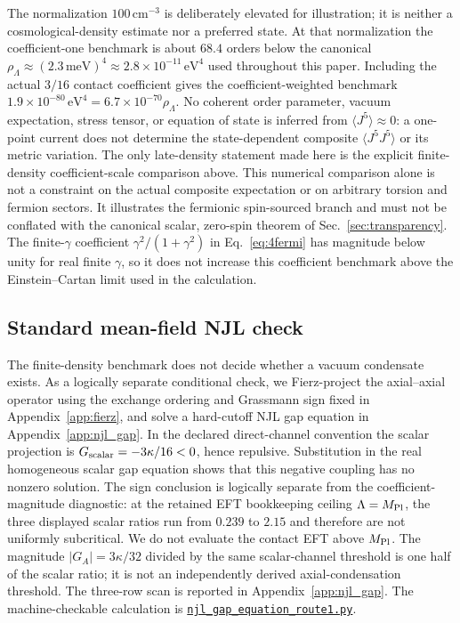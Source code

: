 \documentclass[aps,prd,twocolumn,superscriptaddress,preprintnumbers,nofootinbib,longbibliography,floatfix]{revtex4-2}
\newcommand{\artifactnamed}[2]{\href{https://github.com/Hubify-Projects/bigbounce/blob/main/#1}{\nolinkurl{#2}}}
\begin{document}
The normalization $100\,\mathrm{cm}^{-3}$ is deliberately elevated for
illustration; it is neither a cosmological-density estimate nor a preferred
state.  At that normalization the coefficient-one benchmark is about $68.4$
orders below the canonical
$\rho_\Lambda\approx (2.3\,\text{meV})^4 \approx 2.8\times 10^{-11}\,\text{eV}^4$
used throughout this paper.  Including the actual $3/16$ contact coefficient
gives the coefficient-weighted benchmark
$1.9\times10^{-80}\,\text{eV}^4=6.7\times10^{-70}\rho_\Lambda$.
No coherent order parameter, vacuum expectation, stress tensor, or equation of
state is inferred from $\langle J^5\rangle\approx0$: a one-point current does
not determine the state-dependent composite $\langle J^5J^5\rangle$ or its
metric variation.  The only late-density statement made here is the explicit
finite-density coefficient-scale comparison above.
This numerical comparison alone is not a constraint on the actual composite
expectation or on arbitrary torsion and fermion sectors.  It illustrates the
fermionic spin-sourced branch and must not be conflated with the canonical
scalar, zero-spin theorem of Sec.~\ref{sec:transparency}.  The finite-$\gamma$ coefficient
$\gamma^2/(1+\gamma^2)$ in Eq.~\eqref{eq:4fermi} has magnitude below unity for
real finite $\gamma$, so it does not increase this coefficient benchmark above
the Einstein--Cartan limit used in the calculation.

\subsection{Standard mean-field NJL check}

The finite-density benchmark does not decide whether a vacuum condensate
exists.  As a logically separate conditional check, we Fierz-project the
axial--axial operator using the exchange ordering and Grassmann sign fixed in
Appendix~\ref{app:fierz}, and solve a
hard-cutoff NJL gap equation in Appendix~\ref{app:njl_gap}.  In the declared
direct-channel convention the scalar projection is
$G_{\rm scalar}=-3\kappa/16<0$, hence repulsive.  Substitution in the real
homogeneous scalar gap equation shows that this negative coupling has no
nonzero solution.  The sign conclusion is logically separate from the
coefficient-magnitude diagnostic: at the retained EFT bookkeeping ceiling
$\Lambda=M_{\rm Pl}$, the three displayed scalar ratios run from $0.239$ to
$2.15$ and therefore are not uniformly subcritical.  We do not evaluate the
contact EFT above $M_{\rm Pl}$.  The magnitude $|G_A|=3\kappa/32$ divided by
the same scalar-channel threshold is one half of the scalar ratio; it is not
an independently derived axial-condensation threshold.  The three-row scan is
reported in Appendix~\ref{app:njl_gap}.
The machine-checkable calculation is
\artifactnamed{arxiv/scripts/njl_gap_equation_route1.py}{njl_gap_equation_route1.py}.
\end{document}

